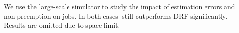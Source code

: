 %
We use the large-scale simulator to study the impact of estimation errors and non-preemption on \burstq jobs. 
In both cases, \name still outperforms DRF significantly. Results are omitted due to space limit.
%
%
%
%
%
%
